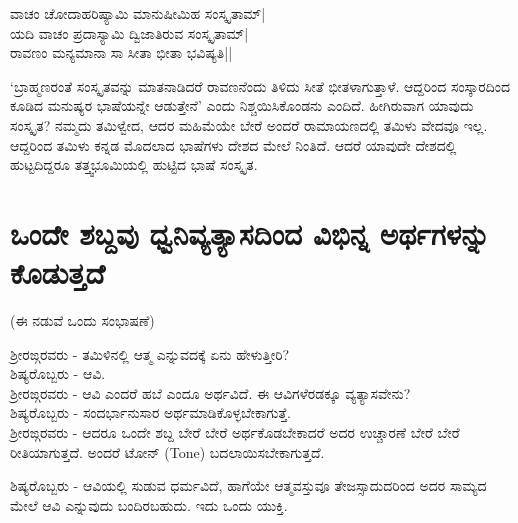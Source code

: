\begin{shloka}
ವಾಚಂ ಚೋದಾಹರಿಷ್ಯಾಮಿ ಮಾನುಷೀಮಿಹ ಸಂಸ್ಕೃತಾಮ್|\\
ಯದಿ ವಾಚಂ ಪ್ರದಾಸ್ಯಾಮಿ ದ್ವಿಜಾತಿರುವ ಸಂಸ್ಕೃತಾಮ್|\\
ರಾವಣಂ ಮನ್ಯಮಾನಾ‌ ಸಾ ಸೀತಾ ಭೀತಾ ಭವಿಷ್ಯತಿ||
\end{shloka}

`ಬ್ರಾಹ್ಮಣರಂತೆ ಸಂಸ್ಕೃತವನ್ನು ಮಾತನಾಡಿದರೆ ರಾವಣನೆಂದು ತಿಳಿದು ಸೀತೆ ಭೀತಳಾಗುತ್ತಾಳೆ. ಆದ್ದರಿಂದ ಸಂಸ್ಕಾರದಿಂದ ಕೂಡಿದ ಮನುಷ್ಯರ ಭಾಷೆಯನ್ನೇ ಆಡುತ್ತೇನೆ' ಎಂದು ನಿಶ್ಚಯಿಸಿಕೊಂಡನು ಎಂದಿದೆ. ಹೀಗಿರುವಾಗ ಯಾವುದು ಸಂಸ್ಕೃತ? ನಮ್ಮದು ತಮಿಳ್ವೇದ, ಆದರ ಮಹಿಮೆಯೇ ಬೇರೆ ಅಂದರೆ ರಾಮಾಯಣದಲ್ಲಿ ತಮಿಳು ವೇದವೂ ಇಲ್ಲ. ಆದ್ದರಿಂದ ತಮಿಳು ಕನ್ನಡ ಮೊದಲಾದ ಭಾಷೆಗಳು ದೇಶದ ಮೇಲೆ ನಿಂತಿದೆ. ಆದರೆ ಯಾವುದೇ ದೇಶದಲ್ಲಿ ಹುಟ್ಟದಿದ್ದರೂ ತತ್ತ್ವಭೂಮಿಯಲ್ಲಿ ಹುಟ್ಟಿದ ಭಾಷೆ ಸಂಸ್ಕೃತ. 

\section*{ಒಂದೇ ಶಬ್ದವು ಧ್ವನಿವ್ಯತ್ಯಾಸದಿಂದ ವಿಭಿನ್ನ ಅರ್ಥಗಳನ್ನು ಕೊಡುತ್ತದೆ}

(ಈ ನಡುವೆ ಒಂದು ಸಂಭಾಷಣೆ)

ಶ್ರೀರಙ್ಗರವರು - ತಮಿಳಿನಲ್ಲಿ ಆತ್ಮ ಎನ್ನುವದಕ್ಕೆ ಏನು ಹೇಳುತ್ತೀರಿ? \\
ಶಿಷ್ಯರೊಬ್ಬರು - ಆವಿ. \\
ಶ್ರೀರಙ್ಗರವರು - ಆವಿ ಎಂದರೆ ಹಬೆ ಎಂದೂ ಅರ್ಥವಿದೆ. ಈ ಆವಿಗಳೆರಡಕ್ಕೂ ವ್ಯತ್ಯಾಸವೇನು? \\
ಶಿಷ್ಯರೊಬ್ಬರು - ಸಂದರ್ಭಾನುಸಾರ ಅರ್ಥಮಾಡಿಕೊಳ್ಳಬೇಕಾಗುತ್ತೆ.\\
ಶ್ರೀರಙ್ಗರವರು - ಆದರೂ ಒಂದೇ ಶಬ್ದ ಬೇರೆ ಬೇರೆ ಅರ್ಥಕೊಡಬೇಕಾದರೆ  ಅದರ ಉಚ್ಚಾರಣೆ ಬೇರೆ ಬೇರೆ ರೀತಿಯಾಗುತ್ತದೆ. ಅಂದರೆ ಟೋನ್ ({\eng Tone}) ಬದಲಾಯಿಸಬೇಕಾಗುತ್ತದೆ.

ಶಿಷ್ಯರೊಬ್ಬರು - ಆವಿಯಲ್ಲಿ ಸುಡುವ ಧರ್ಮವಿದೆ, ಹಾಗೆಯೇ ಆತ್ಮವಸ್ತುವೂ ತೇಜಸ್ಸಾದುದರಿಂದ ಅದರ ಸಾಮ್ಯದ ಮೇಲೆ ಆವಿ ಎನ್ನುವುದು ಬಂದಿರಬಹುದು. ಇದು ಒಂದು ಯುಕ್ತಿ. 

